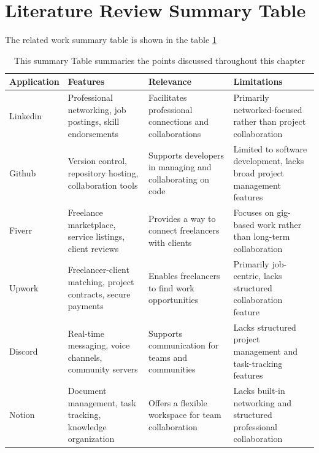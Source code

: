 \documentclass{FastFyp}
\begin{document}
\section{Literature Review Summary Table}
The related work summary table is shown in the table \ref{tab:1}
\begin{table}[!h]
\centering
\caption{
This summary Table summaries the points discussed throughout this chapter
}

\begin{tabular}{|p{3cm}|p{4cm}|p{4cm}|p{4cm}|}
\hline
    \textbf{Application} & \textbf{Features} & \textbf{Relevance} & \textbf{Limitations} \\
\hline
Linkedin \cite{ref:LinkedIn} & Professional networking, job postings, skill endorsements & Facilitates professional connections and collaborations & Primarily networked-focused rather than project collaboration \\
\hline
Github \cite{ref:GitHub} & Version control, repository hosting, collaboration tools & Supports developers in managing and collaborating on code & Limited to software development, lacks broad project management features \\
\hline
Fiverr \cite{ref:Fiverr} & Freelance marketplace, service listings, client reviews & Provides a way to connect freelancers with clients & Focuses on gig-based work rather than long-term collaboration \\
\hline
Upwork \cite{ref:Upwork} & Freelancer-client matching, project contracts, secure payments & Enables freelancers to find work opportunities & Primarily job-centric, lacks structured collaboration feature \\
\hline
Discord \cite{ref:Discord} & Real-time messaging, voice channels, community servers & Supports communication for teams and communities & Lacks structured project management and task-tracking features \\
\hline
Notion \cite{ref:Notion} & Document management, task tracking, knowledge organization & Offers a flexible workspace for team collaboration & Lacks built-in networking and structured professional collaboration \\
\hline
\end{tabular}
\label{tab:1}
\end{table}
\end{document}
